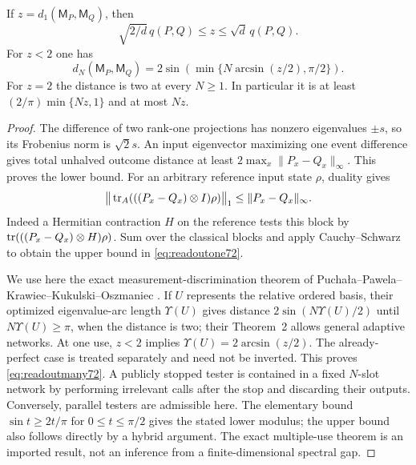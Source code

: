 \begin{lemma}\label{lem:readoutmodulus72}
If $z=d_1(\mathsf M_P,\mathsf M_Q)$, then
\begin{equation}\label{eq:readoutone72}
 \sqrt{2/d}\,q(P,Q)\le z\le\sqrt d\,q(P,Q).
\end{equation}
For $z<2$ one has
\begin{equation}\label{eq:readoutmany72}
 d_N(\mathsf M_P,\mathsf M_Q)
   =2\sin\!\left(\min\{N\arcsin(z/2),\pi/2\}\right).
\end{equation}
For $z=2$ the distance is two at every $N\ge1$. In particular it is
at least $(2/\pi)\min\{Nz,1\}$ and at most $Nz$.
\end{lemma}
\begin{proof}
The difference of two rank-one projections has nonzero eigenvalues
$\pm s$, so its Frobenius norm is $\sqrt2s$. An input eigenvector
maximizing one event difference gives total unhalved outcome distance
at least $2\max_x\|P_x-Q_x\|_\infty$. This proves the lower bound.
For an arbitrary reference input state $\rho$, duality gives
\[
 \big\|\operatorname{tr}_A(((P_x-Q_x)\otimes I)\rho)\big\|_1
 \le\|P_x-Q_x\|_\infty.
\]
Indeed a Hermitian contraction $H$ on the reference tests this block
by $\operatorname{tr}(((P_x-Q_x)\otimes H)\rho)$. Sum over the classical blocks
and apply Cauchy--Schwarz to obtain the upper bound in
\eqref{eq:readoutone72}.

We use here the exact measurement-discrimination theorem of
Pucha\l a--Pawela--Krawiec--Kukulski--Oszmaniec
\cite[Corollary~1 and Theorem~2]{PPKKO72}. If $U$ represents the relative
ordered basis, their optimized eigenvalue-arc length $\Upsilon(U)$
gives distance $2\sin(N\Upsilon(U)/2)$ until
$N\Upsilon(U)\ge\pi$, when the distance is two; their Theorem~2
allows general adaptive networks. At one use, $z<2$ implies
$\Upsilon(U)=2\arcsin(z/2)$. The already-perfect case is treated
separately and need not be inverted. This proves
\eqref{eq:readoutmany72}. A publicly stopped tester is contained in
a fixed $N$-slot network by performing irrelevant calls after the
stop and discarding their outputs. Conversely, parallel testers are
admissible here. The elementary bound
$\sin t\ge2t/\pi$ for $0\le t\le\pi/2$ gives the stated lower
modulus; the upper bound also follows directly by a hybrid argument.
The exact multiple-use theorem is an imported result, not an inference
from a finite-dimensional spectral gap.
\end{proof}

